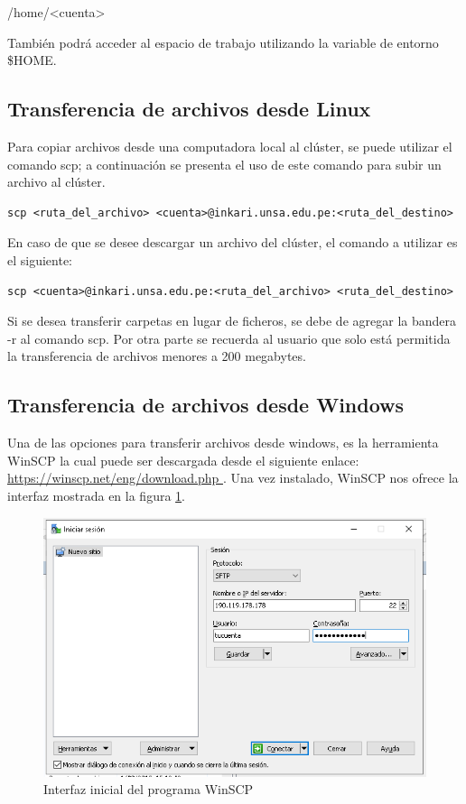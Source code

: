 \documentclass[a4paper,11pt]{article}
\begin{document}
\begin{center} 
    /home/<cuenta>
\end{center} 

También podrá acceder al espacio de trabajo utilizando la variable de entorno \$HOME.

\subsection{Transferencia de archivos desde Linux}

Para copiar archivos desde una computadora local al clúster, se puede utilizar el comando scp; a continuación se presenta el uso de este comando para subir un archivo al clúster.

\begin{lstlisting}
scp <ruta_del_archivo> <cuenta>@inkari.unsa.edu.pe:<ruta_del_destino>
\end{lstlisting}

En caso de que se desee descargar un archivo del clúster, el comando a utilizar es el siguiente:

\begin{lstlisting}
scp <cuenta>@inkari.unsa.edu.pe:<ruta_del_archivo> <ruta_del_destino>
\end{lstlisting}

Si se desea transferir carpetas en lugar de ficheros, se debe de agregar la bandera -r al comando scp. Por otra parte se recuerda al usuario que solo está permitida la transferencia de archivos menores a 200 megabytes.

\subsection{Transferencia de archivos desde Windows}

Una de las opciones para transferir archivos desde windows, es la herramienta WinSCP la cual puede ser descargada desde el siguiente enlace: \url{https://winscp.net/eng/download.php   }.
Una vez instalado, WinSCP nos ofrece la interfaz mostrada en la figura \ref{fig:winscp_1}.

\newpage

\begin{figure}[!ht]
    \centering
    \includegraphics[width=12.4cm]{winscp_1}
    \caption{Interfaz inicial del programa WinSCP}
    \label{fig:winscp_1}
\end{figure}
\end{document}
